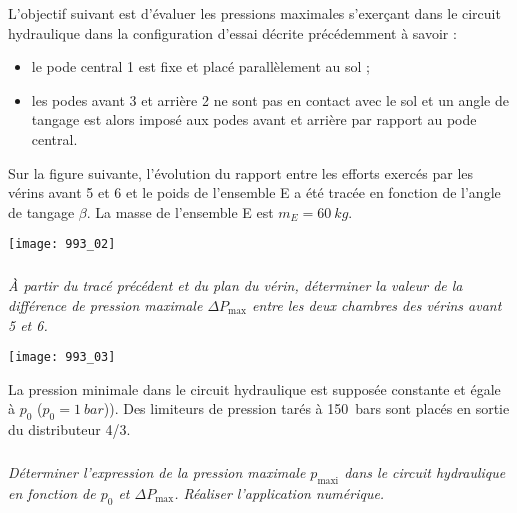 L’objectif suivant est d’évaluer les pressions maximales s’exerçant dans le circuit hydraulique dans la configuration
d’essai décrite précédemment à savoir :
\begin{itemize}
\item le pode central 1 est fixe et placé parallèlement au sol ;
\item  les podes avant 3 et arrière 2 ne sont pas en contact avec le sol et un angle de tangage est alors imposé aux
podes avant et arrière par rapport au pode central.
\end{itemize}
Sur la figure suivante, l’évolution du rapport entre les efforts exercés par les vérins avant 5 et 6 et le poids de l’ensemble E a
été tracée en fonction de l’angle de tangage $\beta$. La masse de l’ensemble E est $m_E=\SI{60}{kg}$.

\begin{center}
\texttt{[image: 993\_02]}
\end{center}

\subparagraph{}
\textit{À partir du tracé précédent et du plan du vérin, déterminer la valeur de la différence de
pression maximale $\Delta P _{\text{max}}$ entre les deux chambres des vérins avant 5 et 6.}
\ifprof
\begin{corrige}
\end{corrige}
\else
\fi


\begin{center}
\texttt{[image: 993\_03]}
\end{center}

La pression minimale dans le circuit hydraulique est supposée constante et égale à $p_0$ ($p_0 = \SI{1}{bar}$)). Des limiteurs de pression tarés à \SI{150}{bars} sont placés en sortie du distributeur 4/3.

\subparagraph{}
\textit{Déterminer l’expression de la pression maximale  $p_{\text{maxi}}$ dans le circuit hydraulique en fonction de $p_0$ et $\Delta P _{\text{max}}$. Réaliser l’application numérique.}%
\ifprof
\begin{corrige}
\end{corrige}
\else
\fi
